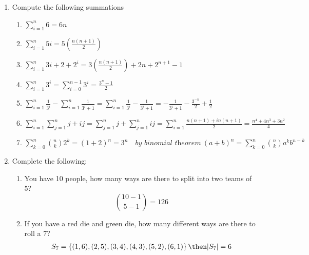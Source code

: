 \documentclass[basic, header]{nosvagor-notes}
\begin{document}
\begin{enumerate}

  \item Compute the following summations
    \begin{enumerate}
      \item \(\displaystyle \sum_{i=1}^{n} 6 = \boxed{6n}\)

      \item \(\displaystyle \sum_{i=1}^{n} 5i = 5\left( \frac{n(n+1)}{2} \right) \)

      \item \(\displaystyle \sum_{i=1}^{n} 3i + 2 + 2^i =
        3\left(\frac{n(n+1)}{2}\right) + 2n + 2^{n+1}-1
        \)

      \item \(\displaystyle \sum_{i=1}^{n} 3^i = \sum_{i=0}^{n-1} 3^i = \frac{3^{n}-1}{2} \)

      \item \(\displaystyle \sum_{i=1}^{n} \frac{1}{3^i} - \sum_{i=1}^{n} \frac{1}{3^i + 1}
        = \sum_{i=1}^{n} \frac{1}{3^i} - \frac{1}{3^i + 1}
        = -\frac{1}{3^i + 1} - \frac{3^{-n}}{2} + \frac{1}{2}
        \)

      \item \(\displaystyle \sum_{i=1}^{n} \sum_{j=1}^{n} j + ij
        = \sum_{j=1}^{n} j + \sum_{j=1}^{n} ij
        = \sum_{i=1}^{n} \frac{n(n+1)+ in(n+1)}{2}
        = \frac{n^4+4n^3+3n^2}{4}
        \)

      \item \(\displaystyle \sum_{k=0}^{n} {n \choose k} 2^k
        = \left(1+2\right)^n = 3^n \quad \textit{by binomial theorem}~(a+b)^n = \sum_{k=0}^{n} {n \choose k} a^k b^{n-k}
        \)
    \end{enumerate}

  \newpage %

  \item Complete the following:

    \begin{enumerate}
      \item You have 10 people, how many ways are there to split into two teams of 5?
        \[%
          {10-1 \choose 5-1} = 126
        \]%

      \item If you have a red die and green die, how many different ways are there to roll a 7?
        \begin{align*}
          S_7 &= \left\{ (1,6), (2,5), (3,4), (4,3), (5,2), (6,1) \right\} \then |S_7| = 6 \\
        \end{align*}


\end{enumerate}
\end{enumerate}
\end{document}
